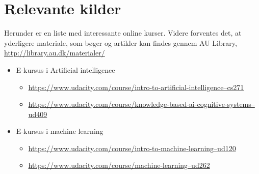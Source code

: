 \section{Relevante kilder}
Herunder er en liste med interessante online kurser. Videre forventes det, at yderligere materiale, som bøger og artikler kan findes gennem AU Library, \href{http://library.au.dk/materialer/}{http://library.au.dk/materialer/}
\begin{itemize}
	\item E-kursus i Artificial intelligence
		\begin{itemize}
			\item \href{https://www.udacity.com/course/intro-to-artificial-intelligence--cs271}{https://www.udacity.com/course/intro-to-artificial-intelligence--cs271}
			\item \href{https://www.udacity.com/course/knowledge-based-ai-cognitive-systems--ud409}{https://www.udacity.com/course/knowledge-based-ai-cognitive-systems--ud409}
		\end{itemize}
	\item E-kursus i machine learning
		\begin{itemize}
			\item \href{https://www.udacity.com/course/intro-to-machine-learning--ud120}{https://www.udacity.com/course/intro-to-machine-learning--ud120}
			\item \href{https://www.udacity.com/course/machine-learning--ud262}{https://www.udacity.com/course/machine-learning--ud262}
		\end{itemize}

\end{itemize}


